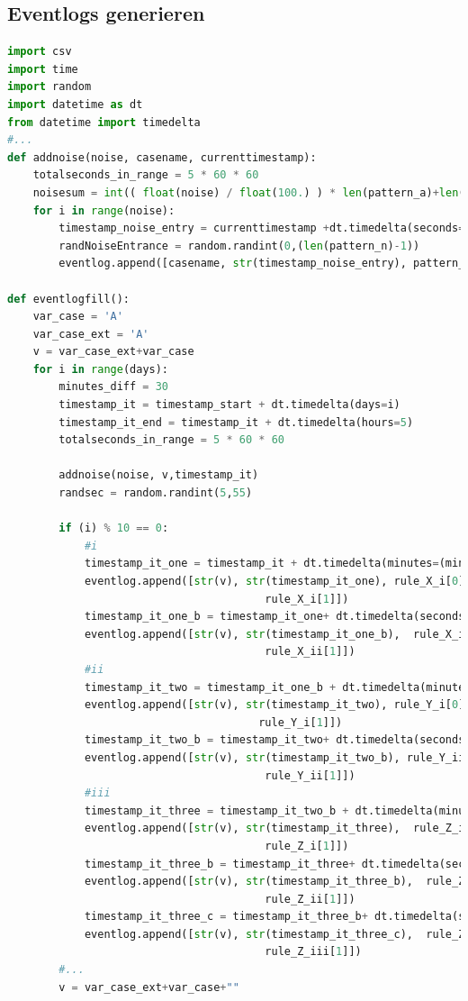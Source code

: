 \subsection{Eventlogs generieren}\label{lst:generate}
\begin{lstlisting}[language=Python]
import csv
import time
import random
import datetime as dt
from datetime import timedelta
#...
def addnoise(noise, casename, currenttimestamp):
    totalseconds_in_range = 5 * 60 * 60
    noisesum = int(( float(noise) / float(100.) ) * len(pattern_a)+len(pattern_b))
    for i in range(noise):
        timestamp_noise_entry = currenttimestamp +dt.timedelta(seconds=random.randint(0,totalseconds_in_range))
        randNoiseEntrance = random.randint(0,(len(pattern_n)-1))
        eventlog.append([casename, str(timestamp_noise_entry), pattern_n[randNoiseEntrance][0],  pattern_n[randNoiseEntrance][0]+" "+pattern_n[randNoiseEntrance][1]])
        
def eventlogfill():
    var_case = 'A'
    var_case_ext = 'A'
    v = var_case_ext+var_case
    for i in range(days):
        minutes_diff = 30
        timestamp_it = timestamp_start + dt.timedelta(days=i)
        timestamp_it_end = timestamp_it + dt.timedelta(hours=5)
        totalseconds_in_range = 5 * 60 * 60
        
        addnoise(noise, v,timestamp_it)
        randsec = random.randint(5,55)
    
        if (i) % 10 == 0:
            #i
            timestamp_it_one = timestamp_it + dt.timedelta(minutes=(minutes_diff))
            eventlog.append([str(v), str(timestamp_it_one), rule_X_i[0],  
                                        rule_X_i[1]])
            timestamp_it_one_b = timestamp_it_one+ dt.timedelta(seconds=80+3*randsec)
            eventlog.append([str(v), str(timestamp_it_one_b),  rule_X_ii[0],  
                                        rule_X_ii[1]])
            #ii
            timestamp_it_two = timestamp_it_one_b + dt.timedelta(minutes=(minutes_diff))            
            eventlog.append([str(v), str(timestamp_it_two), rule_Y_i[0],  
                                       rule_Y_i[1]])
            timestamp_it_two_b = timestamp_it_two+ dt.timedelta(seconds=80+3*randsec)        
            eventlog.append([str(v), str(timestamp_it_two_b), rule_Y_ii[0],  
                                        rule_Y_ii[1]])
            #iii
            timestamp_it_three = timestamp_it_two_b + dt.timedelta(minutes=(minutes_diff))        
            eventlog.append([str(v), str(timestamp_it_three),  rule_Z_i[0],  
                                        rule_Z_i[1]])
            timestamp_it_three_b = timestamp_it_three+ dt.timedelta(seconds=80+3*randsec)
            eventlog.append([str(v), str(timestamp_it_three_b),  rule_Z_ii[0],  
                                        rule_Z_ii[1]])
            timestamp_it_three_c = timestamp_it_three_b+ dt.timedelta(seconds=80+3*randsec)
            eventlog.append([str(v), str(timestamp_it_three_c),  rule_Z_iii[0],  
                                        rule_Z_iii[1]])
        #...
        v = var_case_ext+var_case+""
        

\end{lstlisting}
